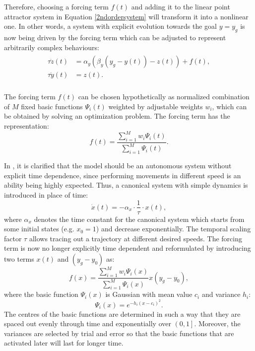 Therefore, choosing a forcing term $f(t)$ and adding it to the linear point attractor system in Equation {\ref{2ndordersystem}} will transform it into a nonlinear one. In other words, a system with explicit evolution towards the goal $y=y_g$ is now being driven by the forcing term which can be adjusted to represent arbitrarily complex behaviours:
\begin{align}
\label{attractorsystemplusforcing}
\begin{split}
\tau\dot{z}(t)&=\alpha_y\left(\beta_y\left(y_g-y(t)\right)-z(t)\right)+f(t),\\
\tau \dot{y}(t) &= z(t).\\
\end{split}
\end{align}

The forcing term $f(t)$ can be chosen hypothetically as normalized combination of $M$ fixed basic functions $\Psi_i(t)$ weighted by adjustable weights $w_i$, which can be obtained by solving an optimization problem. The forcing term has the representation: 
\begin{equation}
\label{forcingtermt}
f(t)=\frac{\sum_{i=1}^{M} w_i\Psi_i(t)}{\sum_{i=1}^{M} \Psi_i(t)}.
\end{equation}

In \cite{ijspeert2013dynamical}, it is clarified that the model should be an autonomous system without explicit time dependence, since performing movements in different speed is an ability being highly expected. Thus, a canonical system with simple dynamics is introduced in place of time:
\begin{equation}
 \label{dmpcanonical}
 \dot{x}(t)=-\alpha_x \cdot \frac{1}{\tau} \cdot x(t),
\end{equation}
where $\alpha_x$ denotes the time constant for the canonical system which starts from some initial states (e.g. $x_0=1$) and decrease exponentially. The temporal scaling factor $ \tau $ allows tracing out a trajectory at different desired speeds. The forcing term is now no longer explicitly time dependent and reformulated by introducing two terms $ x(t) $ and $ (y_g-y_0) $ as:
\begin{equation}
\label{forcingtermx}
f(x)=\frac{\sum_{i=1}^M w_i\Psi_i(x)}{\sum_{i=1}^M \Psi_i(x)}x(y_g-y_0),
\end{equation}
where the basic function $\Psi_i(x)$ is Gaussian with mean value $c_i$ and variance $h_i$:
\begin{equation}
\Psi_i(x)=e^{-h_i(x-c_i)^2}.
\end{equation}
The centres of the basic functions are determined in such a way that they are spaced out evenly through time and exponentially over $ \left(0,1\right] $. Moreover, the variances are selected by trial and error so that the basic functions that are activated later will last for longer time.

